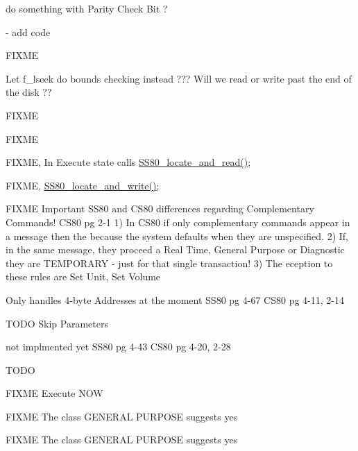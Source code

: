 \begin{DoxyRefList}
\item[\label{todo__todo000064}%
\hypertarget{todo__todo000064}{}%
Global \hyperlink{ss80_8h_a9efbe3d75e86d4003a9fbf1c8cd69919}{S\-S80\-\_\-\-Amigo\-\_\-\-Clear} (void)]do something with Parity Check Bit ?  
\item[\label{todo__todo000065}%
\hypertarget{todo__todo000065}{}%
Global \hyperlink{ss80_8h_a21c26f6bd9041fecdeed562156b0ae92}{S\-S80\-\_\-\-Cancel} (int u)]-\/ add code 

F\-I\-X\-M\-E  
\item[\label{todo__todo000059}%
\hypertarget{todo__todo000059}{}%
Global \hyperlink{ss80_8h_a0d2e3b28c642ea89fea6ff6f8ced5a3b}{S\-S80\-\_\-cmd\-\_\-seek} (void)]Let f\-\_\-lseek do bounds checking instead ??? Will we read or write past the end of the disk ??  
\item[\label{todo__todo000031}%
\hypertarget{todo__todo000031}{}%
Global \hyperlink{ss80_8h_a98c1da720b6dbe5ee9f13b914a913e17}{S\-S80\-\_\-\-Command\-\_\-\-State} (void)]F\-I\-X\-M\-E 

F\-I\-X\-M\-E 

F\-I\-X\-M\-E, In Execute state calls \hyperlink{ss80_8c_acad6de863f4566b55cb8860eb1ffd09c}{S\-S80\-\_\-locate\-\_\-and\-\_\-read()}; 

F\-I\-X\-M\-E, \hyperlink{ss80_8c_a41ef37ec5419463815401485cfcb62b1}{S\-S80\-\_\-locate\-\_\-and\-\_\-write()}; 

F\-I\-X\-M\-E Important S\-S80 and C\-S80 differences regarding Complementary Commands! C\-S80 pg 2-\/1 1) In C\-S80 if only complementary commands appear in a message then the because the system defaults when they are unspecified. 2) If, in the same message, they proceed a Real Time, General Purpose or Diagnostic they are T\-E\-M\-P\-O\-R\-A\-R\-Y -\/ just for that single transaction! 3) The eception to these rules are Set Unit, Set Volume 

Only handles 4-\/byte Addresses at the moment S\-S80 pg 4-\/67 C\-S80 pg 4-\/11, 2-\/14 

T\-O\-D\-O Skip Parameters 

not implmented yet S\-S80 pg 4-\/43 C\-S80 pg 4-\/20, 2-\/28 

T\-O\-D\-O 

F\-I\-X\-M\-E Execute N\-O\-W 

F\-I\-X\-M\-E The class G\-E\-N\-E\-R\-A\-L P\-U\-R\-P\-O\-S\-E suggests yes 

F\-I\-X\-M\-E The class G\-E\-N\-E\-R\-A\-L P\-U\-R\-P\-O\-S\-E suggests yes 


\end{DoxyRefList}

